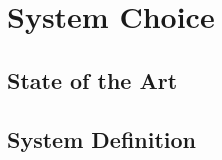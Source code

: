 \chapter{System Choice}


\section{State of the Art}
\label{StateOfTheArt}


\section{System Definition}

